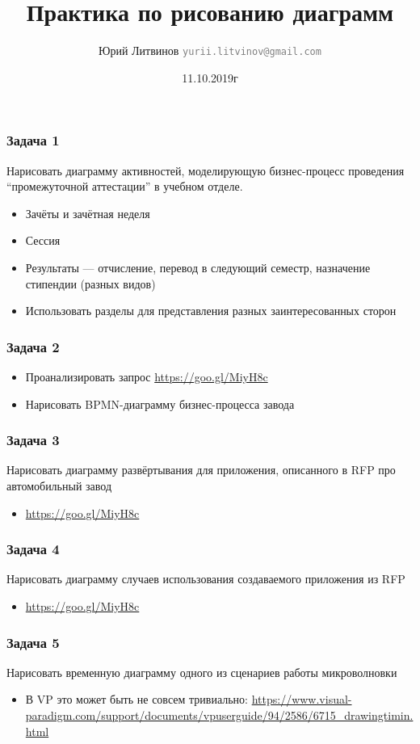 \documentclass[xetex,mathserif,serif]{beamer}
\title{Практика по рисованию диаграмм}
\author[Юрий Литвинов]{Юрий Литвинов \newline \textcolor{gray}{\small\texttt{yurii.litvinov@gmail.com}}}
\date{11.10.2019г}
\begin{document}
	
	\frame{\titlepage}

	\begin{frame}
		\frametitle{Задача 1}
		Нарисовать диаграмму активностей, моделирующую бизнес-процесс проведения ``промежуточной аттестации'' в учебном отделе.
		\begin{itemize}
			\item Зачёты и зачётная неделя
			\item Сессия
			\item Результаты --- отчисление, перевод в следующий семестр, назначение стипендии (разных видов)
			\item Использовать разделы для представления разных заинтересованных сторон
		\end{itemize}
	\end{frame}

	\begin{frame}
		\frametitle{Задача 2}
		\begin{itemize}
			\item Проанализировать запрос \url{https://goo.gl/MiyH8c}
			\item Нарисовать BPMN-диаграмму бизнес-процесса завода
		\end{itemize}
	\end{frame}

	\begin{frame}
		\frametitle{Задача 3}
		Нарисовать диаграмму развёртывания для приложения, описанного в RFP про автомобильный завод
		\begin{itemize}
			\item \url{https://goo.gl/MiyH8c}
		\end{itemize}
	\end{frame}

	\begin{frame}
		\frametitle{Задача 4}
		Нарисовать диаграмму случаев использования создаваемого приложения из RFP
		\begin{itemize}
			\item \url{https://goo.gl/MiyH8c}
		\end{itemize}
	\end{frame}

	\begin{frame}
		\frametitle{Задача 5}
		Нарисовать временную диаграмму одного из сценариев работы микроволновки
		\begin{itemize}
			\item В VP это может быть не совсем тривиально: \url{https://www.visual-paradigm.com/support/documents/vpuserguide/94/2586/6715_drawingtimin.html}
		\end{itemize}
	\end{frame}
\end{document}
